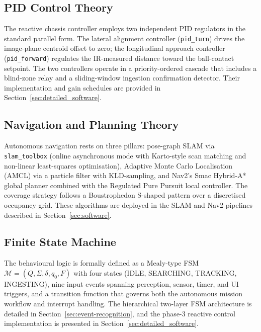 \subsection{PID Control Theory}
\label{sec:theory_pid}

The reactive chassis controller employs two independent PID regulators in the standard parallel form. The lateral alignment controller (\texttt{pid\_turn}) drives the image-plane centroid offset to zero; the longitudinal approach controller (\texttt{pid\_forward}) regulates the IR-measured distance toward the ball-contact setpoint. The two controllers operate in a priority-ordered cascade that includes a blind-zone relay and a sliding-window ingestion confirmation detector. Their implementation and gain schedules are provided in Section~\ref{sec:detailed_software}.

\subsection{Navigation and Planning Theory}
\label{sec:theory_nav}

Autonomous navigation rests on three pillars: pose-graph SLAM via \texttt{slam\_toolbox} (online asynchronous mode with Karto-style scan matching and non-linear least-squares optimisation), Adaptive Monte Carlo Localisation (AMCL) via a particle filter with KLD-sampling, and Nav2's Smac Hybrid-A* global planner combined with the Regulated Pure Pursuit local controller. The coverage strategy follows a Boustrophedon S-shaped pattern over a discretised occupancy grid. These algorithms are deployed in the SLAM and Nav2 pipelines described in Section~\ref{sec:software}.

\subsection{Finite State Machine}
\label{sec:theory_fsm}

The behavioural logic is formally defined as a Mealy-type FSM $\mathcal{M} = (Q, \Sigma, \delta, q_0, F)$ with four states (IDLE, SEARCHING, TRACKING, INGESTING), nine input events spanning perception, sensor, timer, and UI triggers, and a transition function that governs both the autonomous mission workflow and interrupt handling. The hierarchical two-layer FSM architecture is detailed in Section~\ref{sec:event-recognition}, and the phase-3 reactive control implementation is presented in Section~\ref{sec:detailed_software}.

